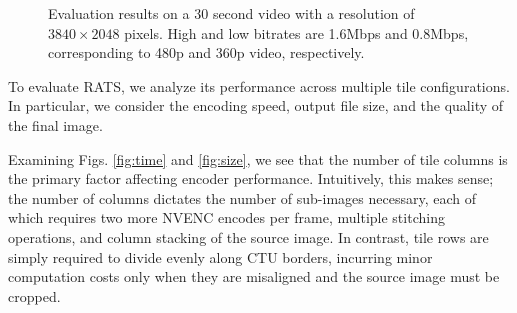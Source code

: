 \begin{figure}[t]
	\centering
	\caption{Evaluation results on a 30 second video with a resolution of $3840\times2048$ pixels. High and low bitrates are 1.6Mbps and 0.8Mbps, corresponding to 480p and 360p video, respectively.\protect\footnotemark}
	\label{fig:eval}
\end{figure}
To evaluate RATS, we analyze its performance across multiple tile configurations. In particular, we consider the encoding speed, output file size, and the quality of the final image.

Examining Figs. \ref{fig:time} and \ref{fig:size}, we see that the number of tile columns is the primary factor affecting encoder performance. Intuitively, this makes sense; the number of columns dictates the number of sub-images necessary, each of which requires two more NVENC encodes per frame, multiple stitching operations, and column stacking of the source image. In contrast, tile rows are simply required to divide evenly along CTU borders, incurring minor computation costs only when they are misaligned and the source image must be cropped.

